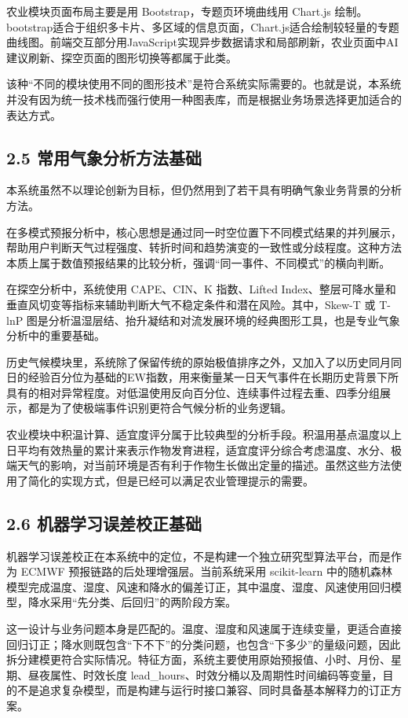 农业模块页面布局主要是用 Bootstrap，专题页环境曲线用 Chart.js 绘制。bootstrap适合于组织多卡片、多区域的信息页面，Chart.js适合绘制较轻量的专题曲线图。前端交互部分用JavaScript实现异步数据请求和局部刷新，农业页面中AI建议刷新、探空页面的图形切换等都属于此类。

该种“不同的模块使用不同的图形技术”是符合系统实际需要的。也就是说，本系统并没有因为统一技术栈而强行使用一种图表库，而是根据业务场景选择更加适合的表达方式。

\subsection{2.5 常用气象分析方法基础}

本系统虽然不以理论创新为目标，但仍然用到了若干具有明确气象业务背景的分析方法。

在多模式预报分析中，核心思想是通过同一时空位置下不同模式结果的并列展示，帮助用户判断天气过程强度、转折时间和趋势演变的一致性或分歧程度。这种方法本质上属于数值预报结果的比较分析，强调“同一事件、不同模式”的横向判断。

在探空分析中，系统使用 CAPE、CIN、K 指数、Lifted Index、整层可降水量和垂直风切变等指标来辅助判断大气不稳定条件和潜在风险。其中，Skew-T 或 T-lnP 图是分析温湿层结、抬升凝结和对流发展环境的经典图形工具，也是专业气象分析中的重要基础。

历史气候模块里，系统除了保留传统的原始极值排序之外，又加入了以历史同月同日的经验百分位为基础的EW指数，用来衡量某一日天气事件在长期历史背景下所具有的相对异常程度。对低温使用反向百分位、连续事件过程去重、四季分组展示，都是为了使极端事件识别更符合气候分析的业务逻辑。

农业模块中积温计算、适宜度评分属于比较典型的分析手段。积温用基点温度以上日平均有效热量的累计来表示作物发育进程，适宜度评分综合考虑温度、水分、极端天气的影响，对当前环境是否有利于作物生长做出定量的描述。虽然这些方法使用了简化的实现方式，但是已经可以满足农业管理提示的需要。

\subsection{2.6 机器学习误差校正基础}

机器学习误差校正在本系统中的定位，不是构建一个独立研究型算法平台，而是作为 ECMWF 预报链路的后处理增强层。当前系统采用 scikit-learn 中的随机森林模型完成温度、湿度、风速和降水的偏差订正，其中温度、湿度、风速使用回归模型，降水采用“先分类、后回归”的两阶段方案。

这一设计与业务问题本身是匹配的。温度、湿度和风速属于连续变量，更适合直接回归订正；降水则既包含“下不下”的分类问题，也包含“下多少”的量级问题，因此拆分建模更符合实际情况。特征方面，系统主要使用原始预报值、小时、月份、星期、昼夜属性、时效长度 lead\_hours、时效分桶以及周期性时间编码等变量，目的不是追求复杂模型，而是构建与运行时接口兼容、同时具备基本解释力的订正方案。

